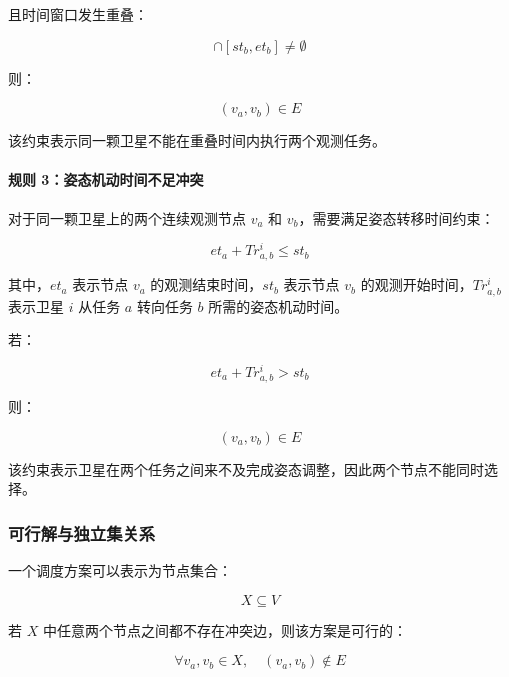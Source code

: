 \documentclass[UTF8,a4paper,12pt]{ctexart}
\begin{document}
且时间窗口发生重叠：

\begin{equation}
[st_a,et_a]\cap[st_b,et_b]\neq \emptyset
\end{equation}

则：

\begin{equation}
(v_a,v_b)\in E
\end{equation}

该约束表示同一颗卫星不能在重叠时间内执行两个观测任务。

\paragraph{规则 3：姿态机动时间不足冲突}

对于同一颗卫星上的两个连续观测节点 $v_a$ 和 $v_b$，需要满足姿态转移时间约束：

\begin{equation}
et_a+Tr_{a,b}^{i}\leq st_b
\end{equation}

其中，$et_a$ 表示节点 $v_a$ 的观测结束时间，$st_b$ 表示节点 $v_b$ 的观测开始时间，$Tr_{a,b}^{i}$ 表示卫星 $i$ 从任务 $a$ 转向任务 $b$ 所需的姿态机动时间。

若：

\begin{equation}
et_a+Tr_{a,b}^{i}>st_b
\end{equation}

则：

\begin{equation}
(v_a,v_b)\in E
\end{equation}

该约束表示卫星在两个任务之间来不及完成姿态调整，因此两个节点不能同时选择。

\subsubsection{可行解与独立集关系}

一个调度方案可以表示为节点集合：

\begin{equation}
X\subseteq V
\end{equation}

若 $X$ 中任意两个节点之间都不存在冲突边，则该方案是可行的：

\begin{equation}
\forall v_a,v_b\in X,\quad (v_a,v_b)\notin E
\end{equation}
\end{document}
